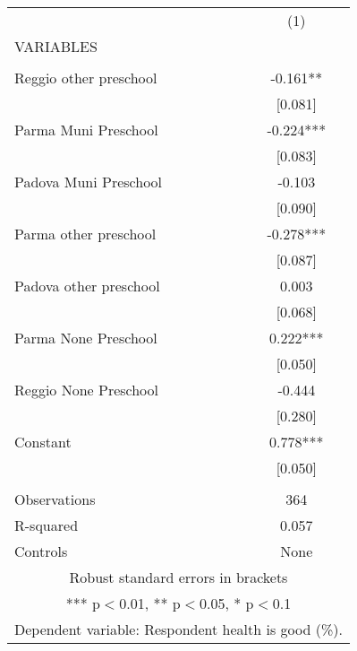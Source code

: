 \begin{tabular}{lc} \hline
 & (1) \\
VARIABLES &  \\ \hline
 &  \\
Reggio other preschool & -0.161** \\
 & [0.081] \\
Parma Muni Preschool & -0.224*** \\
 & [0.083] \\
Padova Muni Preschool & -0.103 \\
 & [0.090] \\
Parma other preschool & -0.278*** \\
 & [0.087] \\
Padova other preschool & 0.003 \\
 & [0.068] \\
Parma None Preschool & 0.222*** \\
 & [0.050] \\
Reggio None Preschool & -0.444 \\
 & [0.280] \\
Constant & 0.778*** \\
 & [0.050] \\
 &  \\
Observations & 364 \\
R-squared & 0.057 \\
 Controls & None \\ \hline
\multicolumn{2}{c}{ Robust standard errors in brackets} \\
\multicolumn{2}{c}{ *** p$<$0.01, ** p$<$0.05, * p$<$0.1} \\
\multicolumn{2}{c}{ Dependent variable: Respondent health is good (\%).} \\
\end{tabular}
